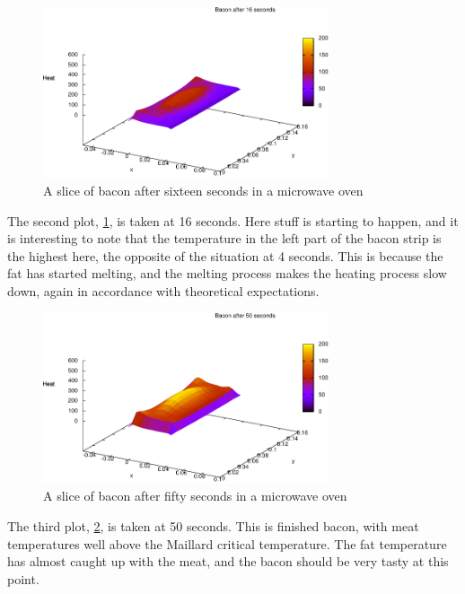 \begin{figure}[!h]
  \begin{center}
    \includegraphics[width=0.75\textwidth]{bacon-16sec.pdf}
  \end{center}
  \caption{A slice of bacon after sixteen seconds in a microwave oven}
  \label{fig:bacon-16sec}
\end{figure}

The second plot, \cref{fig:bacon-16sec}, is taken at 16 seconds. Here stuff is
starting to happen, and it is interesting to note that the temperature in the
left part of the bacon strip is the highest here, the opposite of the situation
at 4 seconds. This is because the fat has started melting, and the melting
process makes the heating process slow down, again in accordance with
theoretical expectations. \\

\begin{figure}[!h]
  \begin{center}
    \includegraphics[width=0.75\textwidth]{bacon-50sec.pdf}
  \end{center}
  \caption{A slice of bacon after fifty seconds in a microwave oven}
  \label{fig:bacon-50sec}
\end{figure}

The third plot, \cref{fig:bacon-50sec}, is taken at 50 seconds. This is finished
bacon, with meat temperatures well above the Maillard critical temperature. The
fat temperature has almost caught up with the meat, and the bacon should be very
tasty at this point.


